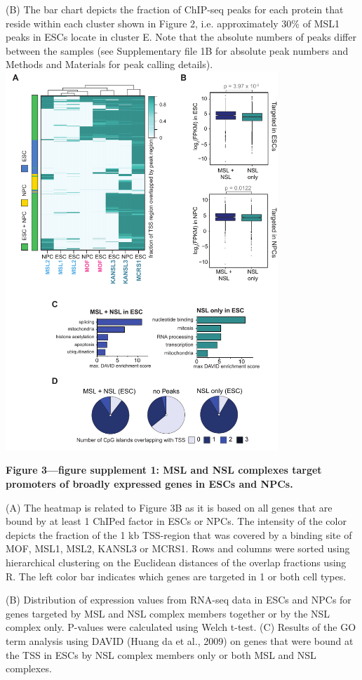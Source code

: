 \begin{footnotesize}
\begin{sffamily}
\begin{singlespacing}
(B) The bar chart depicts the fraction of ChIP-seq peaks for each protein that reside within each cluster shown in Figure 2, i.e. approximately 30\% of MSL1 peaks in ESCs locate in cluster E. Note that the absolute numbers of peaks differ between the samples (see Supplementary file 1B for absolute peak numbers and Methods and Materials for peak calling details).
\newpage
\includegraphics[width=0.77\textwidth]{Figures/Appendix/Figure3_supplemental_figure1_scissored.pdf}

\textbf{Figure 3—figure supplement 1: MSL and NSL complexes target promoters of broadly expressed genes in ESCs and NPCs.
}

(A) The heatmap is related to Figure 3B as it is based on all genes that are bound by at least 1 ChIPed factor in ESCs or NPCs. The intensity of the color depicts the fraction of the 1 kb TSS-region that was covered by a binding site of MOF, MSL1, MSL2, KANSL3 or MCRS1. Rows and columns were sorted using hierarchical clustering on the Euclidean distances of the overlap fractions using R. The left color bar indicates which genes are targeted in 1 or both cell types.

(B) Distribution of expression values from RNA-seq data in ESCs and NPCs for genes targeted by MSL and NSL complex members together or by the NSL complex only. P-values were calculated using Welch t-test.
(C) Results of the GO term analysis using DAVID (Huang da et al., 2009) on genes that were bound at the TSS in ESCs by NSL complex members only or both MSL and NSL complexes.


\end{singlespacing}
\end{sffamily}
\end{footnotesize}
